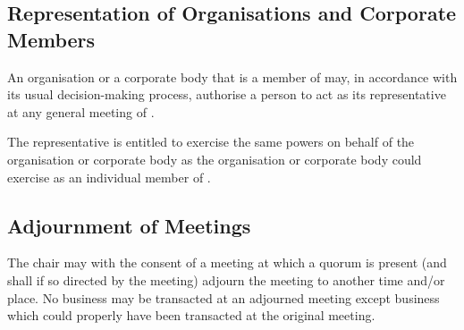     \subsection{Representation of Organisations and Corporate Members}\label{sec:representation_general_meetings}
    An organisation or a corporate body that is a member of \shortname{} may, in accordance with its usual decision-making process, authorise a person to act as its representative at any general meeting of \shortname{}.

    The representative is entitled to exercise the same powers on behalf of the organisation or corporate body as the organisation or corporate body could exercise as an individual member of \shortname{}.

    \subsection{Adjournment of Meetings}\label{sec:adjournment_general_meetings}
    The chair may with the consent of a meeting at which a quorum is present (and shall if so directed by the meeting) adjourn the meeting to another time and/or place. No business may be transacted at an adjourned meeting except business which could properly have been transacted at the original meeting.
